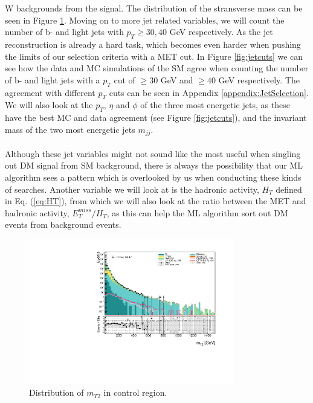 \documentclass[12pt, a4paper]{book}
\begin{document}
W backgrounds from the signal. The distribution of the stransverse mass can be seen in Figure \ref{fig:mt2_dist}. Moving on to more jet related variables, we will count the number of b- and light jets with $p_T \ge 30, 40$ GeV respectively. As the jet reconstruction is already a hard task, 
which becomes even harder when pushing the limits of our selection criteria with a MET cut. In Figure \ref{fig:jetcuts} we can see how the data and MC simulations of the SM agree when counting the number of b- and light jets with a $p_T$ cut of $\ge30$ GeV and $\ge40$ GeV respectively. 
The agreement with different $p_T$ cuts can be seen in Appendix \ref{appendix:JetSelection}. We will also look at the $p_T$, $\eta$ and $\phi$ of the three most energetic jets, as these have the best MC and data agreement 
(see Figure \ref{fig:jetcuts}), and the invariant mass of the two most energetic jets $m_{jj}$.\\ 
\\Although these jet variables might not sound like the most useful when singling out DM signal from SM background, there is always the possibility that our ML algorithm sees a pattern which is overlooked by us when conducting these kinds of searches. 
Another variable we will look at is the hadronic activity, $H_T$ defined in Eq. (\ref{eq:HT}), from which we will also look at the ratio between the MET and hadronic activity, $E_T^{miss}/H_T$, as this can help the ML algorithm sort out DM events from background events.\\
\begin{figure}[!ht]
    \centering
        \includegraphics[width=0.8\textwidth]{mt2.pdf}
    \caption{Distribution of $m_{T2}$ in control region.}\label{fig:mt2_dist}
\end{figure}
\graphicspath{{../../../Plots/Data_Analysis/JetSelection/Control_region/}} 
\end{document}
